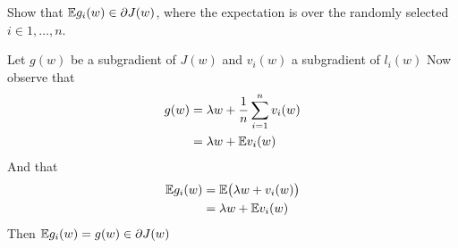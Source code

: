 \documentclass[12pt,letterpaper]{article}
\begin{document}
\begin{problem}{}
Show that $\mathbb{E} g_{i}(w)\in\partial J(w)$, where the
expectation is over the randomly selected $i\in1,\ldots,n$.
\end{problem}
\begin{solution}{}
    Let $g(w)$ be a subgradient of $J(w)$ and $v_i(w)$ a subgradient of $l_i(w)$ Now observe that
    \begin{align*}
        g(w) &= \lambda w + \frac{1}{n}\sum_{i=1}^n v_i(w)\\
        &= \lambda w + \mathbb{E} v_i(w)
    \end{align*}
    And that 
    \begin{align*}
        \mathbb{E} g_i(w) &= \mathbb{E} \big( \lambda w + v_i(w) \big)\\
        &= \lambda w + \mathbb{E} v_i(w)
    \end{align*}
    Then $\mathbb{E} g_i(w) = g(w) \in \partial J(w)$
\end{solution}
\newpage
\end{document}
